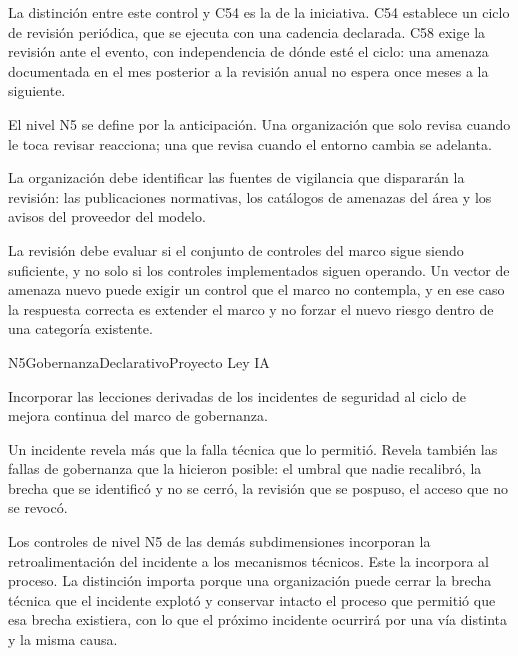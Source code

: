 La distinción entre este control y C54 es la de la iniciativa. C54 establece un ciclo de revisión periódica, que se ejecuta con una cadencia declarada. C58 exige la revisión ante el evento, con independencia de dónde esté el ciclo: una amenaza documentada en el mes posterior a la revisión anual no espera once meses a la siguiente.

El nivel N5 se define por la anticipación. Una organización que solo revisa cuando le toca revisar reacciona; una que revisa cuando el entorno cambia se adelanta.

La organización debe identificar las fuentes de vigilancia que dispararán la revisión: las publicaciones normativas, los catálogos de amenazas del área y los avisos del proveedor del modelo.

La revisión debe evaluar si el conjunto de controles del marco sigue siendo suficiente, y no solo si los controles implementados siguen operando. Un vector de amenaza nuevo puede exigir un control que el marco no contempla, y en ese caso la respuesta correcta es extender el marco y no forzar el nuevo riesgo dentro de una categoría existente.


  {N5}{Gobernanza}{Declarativo}{Proyecto Ley IA}

Incorporar las lecciones derivadas de los incidentes de seguridad al ciclo de mejora continua del marco de gobernanza.

Un incidente revela más que la falla técnica que lo permitió. Revela también las fallas de gobernanza que la hicieron posible: el umbral que nadie recalibró, la brecha que se identificó y no se cerró, la revisión que se pospuso, el acceso que no se revocó.

Los controles de nivel N5 de las demás subdimensiones incorporan la retroalimentación del incidente a los mecanismos técnicos. Este la incorpora al proceso. La distinción importa porque una organización puede cerrar la brecha técnica que el incidente explotó y conservar intacto el proceso que permitió que esa brecha existiera, con lo que el próximo incidente ocurrirá por una vía distinta y la misma causa.

